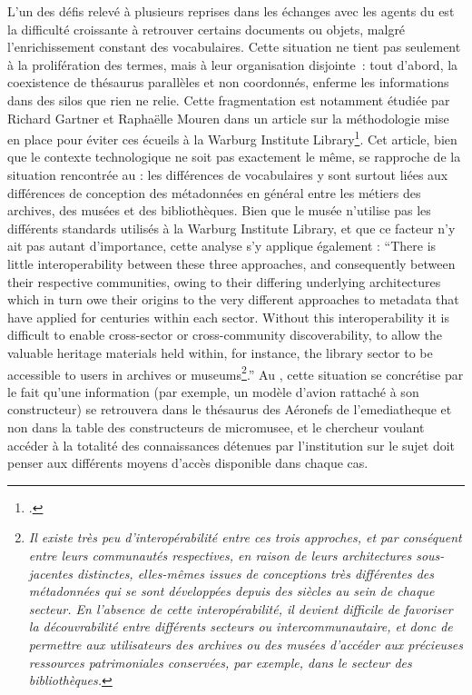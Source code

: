 L’un des défis relevé à plusieurs reprises dans les échanges avec les agents du \mae est la difficulté croissante à retrouver certains documents ou objets, malgré l’enrichissement constant des vocabulaires. Cette situation ne tient pas seulement à la prolifération des termes, mais à leur organisation disjointe : tout d'abord, la coexistence de thésaurus parallèles et non coordonnés, enferme les informations dans des silos que rien ne relie. Cette fragmentation est notamment étudiée par Richard Gartner et Raphaëlle Mouren dans un article sur la méthodologie mise en place pour éviter ces écueils à la Warburg Institute Library\footcite{gartnerArchivesMuseumsLibraries2019}. Cet article, bien que le contexte technologique ne soit pas exactement le même, se rapproche de la situation rencontrée au \mae : les différences de vocabulaires y sont surtout liées aux différences de conception des métadonnées en général entre les métiers des archives, des musées et des bibliothèques. Bien que le musée n'utilise pas les différents standards utilisés à la Warburg Institute Library, et que ce facteur n'y ait pas autant d'importance, cette analyse s'y applique également : \enquote{There is \textelp{} little interoperability between these three approaches, and consequently between their respective communities, owing to their differing underlying architectures which in turn owe their origins to the very different approaches to metadata that have applied for centuries within each sector. Without this interoperability it is difficult to enable cross-sector or cross-community discoverability, to allow the valuable heritage materials held within, for instance, the library sector to be accessible to users in archives or museums\footnote{\textit{Il existe très peu d’interopérabilité entre ces trois approches, et par conséquent entre leurs communautés respectives, en raison de leurs architectures sous-jacentes distinctes, elles-mêmes issues de conceptions très différentes des métadonnées qui se sont développées depuis des siècles au sein de chaque secteur. En l’absence de cette interopérabilité, il devient difficile de favoriser la découvrabilité entre différents secteurs ou intercommunautaire, et donc de permettre aux utilisateurs des archives ou des musées d’accéder aux précieuses ressources patrimoniales conservées, par exemple, dans le secteur des bibliothèques.}\cite{gartnerArchivesMuseumsLibraries2019}}.} Au \mae, cette situation se concrétise par le fait qu'une information (par exemple, un modèle d'avion rattaché à son constructeur) se retrouvera dans le thésaurus des Aéronefs de l'\gls{emediatheque} et non dans la table des constructeurs de \gls{micromusee}, et le chercheur voulant accéder à la totalité des connaissances détenues par l'institution sur le sujet doit penser aux différents moyens d'accès disponible dans chaque cas.

